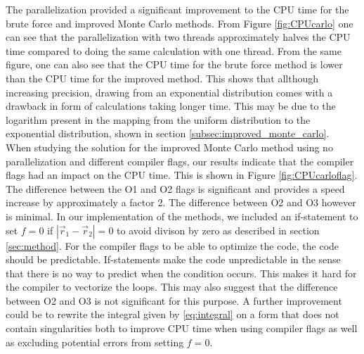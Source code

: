 \documentclass[10pt, twocolumn]{aastex62}
\begin{document}
The parallelization provided a significant improvement to the CPU time for the
brute force and improved Monte Carlo methods. From Figure \ref{fig:CPUcarlo} one
can see that the parallelization with two threads approximately halves the CPU
time compared to doing the same calculation with one thread. From the same
figure, one can also see that the CPU time for the brute force method is
lower than the CPU time for the improved method. This shows that allthough increasing
precision, drawing from an exponential distribution comes with a drawback in
form of calculations taking longer time. This may be due to the logarithm
present in the mapping from the uniform distribution to the exponential
distribution, shown in section \ref{subsec:improved_monte_carlo}.\\

When studying the solution for the improved Monte Carlo method using no
parallelization and different compiler flags, our results indicate that the
compiler flags had an impact on the CPU time. This is shown in Figure
\ref{fig:CPUcarloflag}. The difference between the O1 and
O2 flags is significant and provides a speed increase by approximately a factor 2. The
difference between O2 and O3 however is minimal. In our implementation of the methods, we included an
if-statement to set $f=0$ if $|\vec{r}_1 - \vec{r}_2| = 0$ to avoid divison by
zero as described in section \ref{sec:method}. For the compiler flags to be able
to optimize the code, the code should be predictable. If-statements make the code
unpredictable in the sense that there is no way to predict when the condition
occurs. This makes it hard for the compiler to vectorize the loops. This may
also suggest that the difference between O2 and O3 is not significant for this
purpose. A further improvement could be to rewrite the integral given by
\ref{eq:integral} on a form that does not contain singularities both to improve
CPU time when using compiler flags as well as excluding potential errors from
setting $f=0$.
\end{document}
